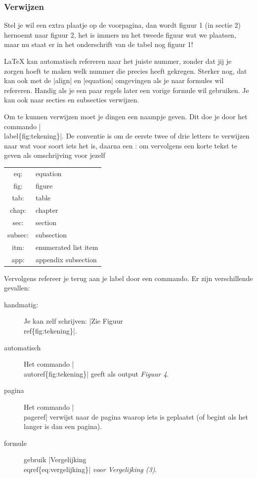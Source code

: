 \documentclass{cursuspresentatie}
\begin{document}
\begin{frame}[allowframebreaks]
	\frametitle{Verwijzen}
	Stel je wil een extra plaatje op de voorpagina, dan wordt figuur 1 (in
	sectie 2) hernoemt naar figuur 2, het is immers nu het tweede figuur wat we
	plaatsen, maar nu staat er in het onderschrift van de tabel nog figuur 1!
	
	\LaTeX{} kan automatisch refereren naar het juiste nummer, zonder dat jij je
	zorgen hoeft te maken welk nummer die precies heeft gekregen. Sterker nog,
	dat kan ook met de \hll|align| en \hll|equation| omgevingen als je
	naar formules wil refereren. Handig als je een paar regels later een vorige
	formule wil gebruiken. Je kan ook naar secties en subsecties verwijzen.
	
	\framebreak
	
	Om te kunnen verwijzen moet je dingen een naampje geven. Dit doe je door het
	commando \alert{\hll|\\label\{fig:tekening\}|}. De conventie
	is om de eerste twee of drie letters te verwijzen naar wat voor soort iets
	het is, daarna een : om vervolgens een korte tekst te geven als omschrijving
	voor jezelf
	
	\begin{table}
		\centering
		\small\begin{tabular}{c|l}
			eq:&	equation \\ 
			fig:&	figure \\
			tab:&	table \\
			chap: &	chapter \\
			sec:&	section \\
			subsec:&	subsection \\
			itm:&	enumerated list item \\
			app:&	appendix subsection
		\end{tabular}
	\end{table}

	\framebreak
	Vervolgens refereer je terug aan je label door een commando. Er zijn verschillende gevallen:
	\begin{description}
		\item[handmatig:]
        Je kan zelf schrijven: \hll|Zie Figuur \\ref\{fig:tekening\}|.
		\item[automatisch] Het commando \hll|\\autoref\{fig:tekening\}| geeft als output
        \textit{Figuur 4}. 
		\item[pagina]  Het commando \hll|\\pageref| verwijst naar de pagina
		waarop iets is geplaatst (of begint als het langer is dan een pagina).
		\item[formule] gebruik \hll|Vergelijking \\eqref\{eq:vergelijking\}| \textit{voor Vergelijking (3)}.
	\end{description}
\end{frame}
	
\end{document}
